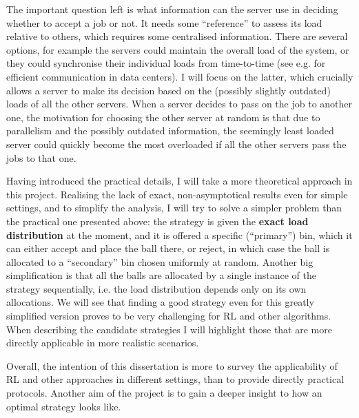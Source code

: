The important question left is what information can the server use in deciding whether to accept a job or not. It needs some ``reference'' to assess its load relative to others, which requires some centralised information. There are several options, for example the servers could maintain the overall load of the system, or they could synchronise their individual loads from time-to-time (see e.g. \cite{zhang2018datacenterloadbalancing} for efficient communication in data centers). I will focus on the latter, which crucially allows a server to make its decision based on the (possibly slightly outdated) loads of all the other servers. When a server decides to pass on the job to another one, the motivation for choosing the other server at random is that due to parallelism and the possibly outdated information, the seemingly least loaded server could quickly become the most overloaded if all the other servers pass the jobs to that one.


Having introduced the practical details, I will take a more theoretical approach in this project. Realising the lack of exact, non-asymptotical results even for simple settings, and to simplify the analysis, I will try to solve a simpler problem than the practical one presented above: the strategy is given the \textbf{exact load distribution} at the moment, and it is offered a specific (``primary'') bin, which it can either accept and place the ball there, or reject, in which case the ball is allocated to a ``secondary'' bin chosen uniformly at random. Another big simplification is that all the balls are allocated by a single instance of the strategy sequentially, i.e. the load distribution depends only on its own allocations. We will see that finding a good strategy even for this greatly simplified version proves to be very challenging for RL and other algorithms. When describing the candidate strategies I will highlight those that are more directly applicable in more realistic scenarios. 


Overall, the intention of this dissertation is more to survey the applicability of RL and other approaches in different settings, than to provide directly practical protocols. Another aim of the project is to gain a deeper insight to how an optimal strategy looks like.

